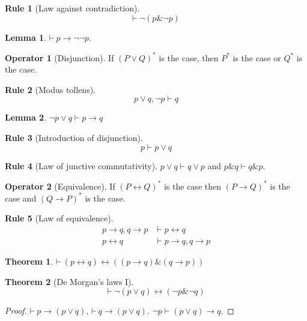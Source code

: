 \documentclass{amsbook}
\newcommand{\infers}{\mathrel\vdash}
\newcommand{\theorem}{\mathord\vdash\medspace}
\newcommand{\then}{\mathrel\rightarrow}
\newcommand{\conj}{\mathrel\&}
\newcommand{\eqv}{\mathrel\leftrightarrow}
\newcommand{\disj}{\mathrel\vee}
\theoremstyle{definition}
\newtheorem{frule}{Rule}[chapter]
\newtheorem{op}{Operator}[chapter]
\newtheorem{thm}{Theorem}[section]
\newtheorem{lmm}{Lemma}[section]
\begin{document}
\begin{frule}[Law against contradiction]
    $$\theorem \neg(p \conj \neg p)$$
\end{frule}

\begin{lmm}
    $\theorem p \then \neg\neg p$.
\end{lmm}

\begin{op}[Disjunction]
    If $(P \disj Q)^*$ is the case, then $P^*$ is the case or $Q^*$ is the case.
\end{op}

\begin{frule}[Modus tollens]
    $$p \disj q, \neg p \infers q$$
\end{frule}

\begin{lmm}
    $\neg p \disj q \infers p \then q$
\end{lmm}

\begin{frule}[Introduction of disjunction]
    $$p \infers p \disj q$$
\end{frule}

\begin{frule}[Law of junctive commutativity]
    $p \disj q \infers q \disj p$ and $p \conj q \infers q \conj p$.
\end{frule}

\begin{op}[Equivalence]
    If $(P \eqv Q)^*$ is the case then $(P \then Q)^*$ is the case and $(Q \then P)^*$ is the case.
\end{op}

\begin{frule}[Law of equivalence]
    \begin{align*}
        p \then q, q \then p & \infers p \eqv q             \\
        p \eqv q             & \infers p \then q, q \then p
    \end{align*}
\end{frule}

\begin{thm}
    $\theorem (p \eqv q) \eqv ((p \then q) \conj (q \then p))$
\end{thm}

\begin{thm}[De Morgan's laws I]
    $$\theorem \neg(p \disj q) \eqv (\neg p \conj \neg q)$$
    \begin{proof}
        $\theorem p \then (p \disj q)$, $\theorem q \then (p \disj q)$. $\neg p \infers (p \disj q) \then q$.
    \end{proof}
\end{thm}
\end{document}
